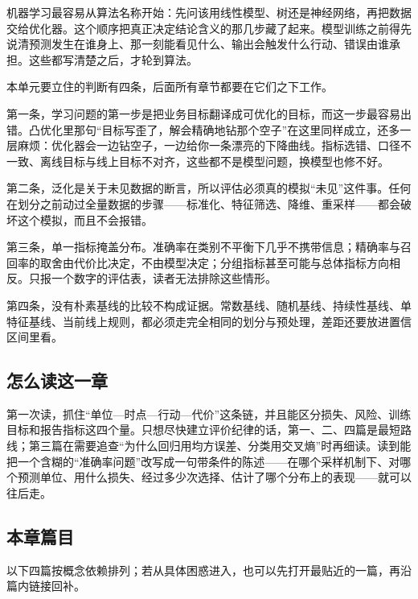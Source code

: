 机器学习最容易从算法名称开始：先问该用线性模型、树还是神经网络，再把数据交给优化器。这个顺序把真正决定结论含义的那几步藏了起来。模型训练之前得先说清预测发生在谁身上、那一刻能看见什么、输出会触发什么行动、错误由谁承担。这些都写清楚之后，才轮到算法。

本单元要立住的判断有四条，后面所有章节都要在它们之下工作。

第一条，学习问题的第一步是把业务目标翻译成可优化的目标，而这一步最容易出错。凸优化里那句``目标写歪了，解会精确地钻那个空子''在这里同样成立，还多一层麻烦：优化器会一边钻空子，一边给你一条漂亮的下降曲线。指标选错、口径不一致、离线目标与线上目标不对齐，这些都不是模型问题，换模型也修不好。

第二条，泛化是关于未见数据的断言，所以评估必须真的模拟``未见''这件事。任何在划分之前动过全量数据的步骤——标准化、特征筛选、降维、重采样——都会破坏这个模拟，而且不会报错。

第三条，单一指标掩盖分布。准确率在类别不平衡下几乎不携带信息；精确率与召回率的取舍由代价比决定，不由模型决定；分组指标甚至可能与总体指标方向相反。只报一个数字的评估表，读者无法排除这些情形。

第四条，没有朴素基线的比较不构成证据。常数基线、随机基线、持续性基线、单特征基线、当前线上规则，都必须走完全相同的划分与预处理，差距还要放进置信区间里看。

\subsection{怎么读这一章}

第一次读，抓住``单位—时点—行动—代价''这条链，并且能区分损失、风险、训练目标和报告指标这四个量。只想尽快建立评价纪律的话，第一、二、四篇是最短路线；第三篇在需要追查``为什么回归用均方误差、分类用交叉熵''时再细读。读到能把一个含糊的``准确率问题''改写成一句带条件的陈述——在哪个采样机制下、对哪个预测单位、用什么损失、经过多少次选择、估计了哪个分布上的表现——就可以往后走。

\subsection{本章篇目}

以下四篇按概念依赖排列；若从具体困惑进入，也可以先打开最贴近的一篇，再沿篇内链接回补。

